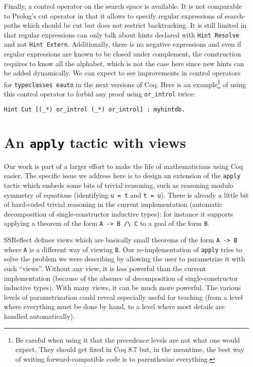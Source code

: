 \documentclass[nocopyrightspace,blockstyle,numbers]{sigplanconf}
\begin{document}
Finally, a control operator on the search space is available. It is
not comparable to Prolog's cut operator in that it allows to specify
regular expressions of search-paths which should be cut but does
not restrict backtracking. It is still
limited in that regular expressions can only talk about hints
declared with \texttt{Hint Resolve} and not \texttt{Hint Extern}.
Additionally, there is no negative expressions and even if regular
expressions are known to be closed under complement, the construction
requires to know all the alphabet, which is not the case here since
new hints can be added dynamically. We can expect to see improvements
in control operators for \texttt{typeclasses eauto} in the next versions
of Coq. Here is an example\footnote{Be careful when using it that the
precedence levels are not what one would expect. They should get fixed
in Coq 8.7 but, in the meantime, the best way of writing
forward-compatible code is to parenthesize everything.}
of using this control operator to forbid any proof using \texttt{or\_introl} twice:

\begin{verbatim}
Hint Cut [(_*) or_introl (_*) or_introl] : myhintdb.
\end{verbatim}

\section{An \texttt{apply} tactic with views}

Our work is part of a larger effort to make the life of mathematicians
using Coq easier. The specific issue we address here is to design an
extension of the \texttt{apply} tactic which embeds some bits of
trivial reasoning, such as reasoning modulo symmetry of equations
(identifying \texttt{u = t} and \texttt{t = u}).
There is already a little bit of hard-coded trivial reasoning in the
current implementation (automatic decomposition of single-constructor
inductive types): for instance it supports applying a theorem
of the form \verb|A -> B /\ C| to a goal of the form \texttt{B}.

SSReflect defines views which are basically small theorems of
the form \texttt{A -> B} where \texttt{A} is a different way of
viewing \texttt{B}. Our re-implementation of \texttt{apply} tries to
solve the problem we were describing by allowing the user to
parametrize it with such ``views''. Without any view, it is less
powerful than the current implementation (because of the absence of
decomposition of single-constructor inductive types). With many
views, it can be much more powerful. The various levels of
parametrization could reveal especially useful for teaching (from a
level where everything must be done by hand, to a level where most
details are handled automatically).
\end{document}
